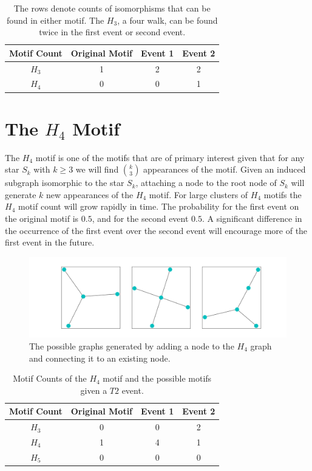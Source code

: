 \begin{table}[h!]
    \centering
        \begin{tabular}{||c c c c||} 
            \hline
            Motif Count & Original Motif & Event 1 & Event 2\\ [0.5ex] 
            \hline\hline
            $H_{3}$ & 1 & 2 & 2\\ 
            \hline
            $H_{4}$ & 0 & 0 & 1\\
            \hline
        \end{tabular}
        \caption{The rows denote counts of isomorphisms that can be found in either 
        motif. The $H_{3}$, a four walk, can be found twice in the first event or second event.}
        \label{table:1}
\end{table}

\section{The \texorpdfstring{$H_{4}$}{H4} Motif}
The $H_{4}$ motif is one of the motifs that are of primary interest given that for any star $S_k$
with $k \geq 3$ we will find ${k \choose 3}$ appearances of the motif. Given an induced subgraph isomorphic to the star $S_k$,
attaching a node to the root node of $S_k$ will generate $k$ new appearances of the $H_4$ motif. For large
clusters of $H_{4}$ motifs the $H_{4}$ motif count will grow rapidly in time. The probability
for the first event on the original motif is $0.5$, and for the second event $0.5$. A significant
difference in the occurrence of the first event over the second event will encourage more of the first event in the future. 

\begin{figure}[!ht]
    \includegraphics[width=14cm]{Images/H4_evolution.png}
    \centering
    \caption{The possible graphs generated by adding a node to the $H_{4}$ graph 
    and connecting it to an existing node.}
    \label{fig:H4T2}
\end{figure}

\begin{table}[h!]
    \centering
    \begin{tabular}{||c c c c||} 
    \hline
    Motif Count & Original Motif & Event 1 & Event 2\\ [0.5ex] 
    \hline\hline
    $H_{3}$ & 0 & 0 & 2\\ 
    \hline
    $H_{4}$ & 1 & 4 & 1\\
    \hline
    $H_{5}$ & 0 & 0 & 0\\
    \hline
   \end{tabular}
   \caption{Motif Counts of the $H_{4}$ motif and the possible 
   motifs given a $T2$ event.}
    \label{table:2}
\end{table}


